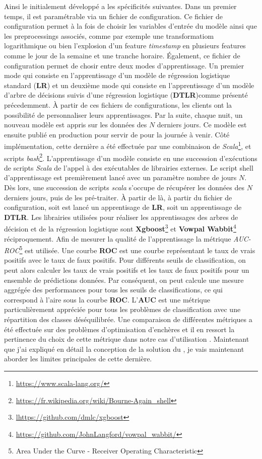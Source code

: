 Ainsi le \bo initialement développé a les spécificités suivantes. Dans un premier temps, il est paramétrable via un fichier de configuration. Ce fichier de configuration permet à la fois de choisir les variables d'entrée du modèle ainsi que les preprocessings associés, comme par exemple une transformatiom logarithmique ou bien l'explosion d'un feature \emph{timestamp} en plusieurs features comme le jour de la semaine et une tranche horaire.
Également, ce fichier de configuration permet de chosir entre deux modes d'apprentissage. Un premier mode qui consiste en l'apprentissage d'un modèle de régression logistique standard (\textbf{LR}) et un deuxième mode qui consiste en l'apprentissage d'un modèle d'arbre de décisions suivis d'une régression logistique (\textbf{DTLR})comme présenté précedemment. 
À partir de ces fichiers de configurations, les clients ont la possibilité de personnaliser leurs apprentissages. Par la suite, chaque nuit, un nouveau modèle est appris sur les données des $N$ derniers jours. Ce modèle est ensuite publié en production pour servir de \bo pour la journée à venir. 
Côté implémentation, cette dernière a été effectuée par une combinaison de \emph{Scala}\footnote{\url{https://www.scala-lang.org/}}, et scripts \emph{bash}\footnote{\url{https://fr.wikipedia.org/wiki/Bourne-Again_shell}}.
L'apprentissage d'un modèle consiste en une succession d'exécutions de scripts \emph{Scala} de l'appel à des exécutables de librairies externes. Le script shell d'apprentissage est premièrement lancé avec un paramètre nombre de jours $N$. Dès lors, une succession de scripts \emph{scala} s'occupe de récupérer les données des $N$ derniers jours, puis de les pré-traiter. À partir de là, à partir du fichier de configuration, soit est lancé un apprentisage de \textbf{LR}, soit un apprentissage de \textbf{DTLR}. Les librairies utilisées pour réaliser les apprentissages des arbres de décision et de la régression logistique sont \textbf{Xgboost}\footnote{\url{lhttps://github.com/dmlc/xgboost}} \cite{Chen:2016:XST:2939672.2939785} et \textbf{Vowpal Wabbit}\footnote{\url{https://github.com/JohnLangford/vowpal_wabbit/}} \cite{langford2009sparse} réciproquement. Afin de mesurer la qualité de l'apprentissage la métrique \emph{AUC-ROC}\footnote{Area Under the Curve - Receiver Operating Characteristic} est utilisée. Une courbe \textbf{ROC} est une courbe représentant le taux de vrais positifs avec le taux de faux positifs. Pour différents seuils de classification, on peut alors calculer les taux de vrais positifs et les taux de faux positifs pour un ensemble de prédictions données. Par conséquent, on peut calcule une mesure aggrégée des performances pour tous les seuils de classifications, ce qui correspond à l'aire sous la courbe \textbf{ROC}. L'\textbf{AUC} est une métrique particulièrement appréciée pour tous les problèmes de classification avec une répartition des classes déséquilibrée. Une comparaison de différentes métriques a été effectuée sur des problèmes d'optimisation d'enchères et il en ressort la pertinence du choix de cette métrique dans notre cas d'utilisation \cite{yi2013predictive}. Maintenant que j'ai expliqué en détail la conception de la solution du \bo, je vais maintenant aborder les limites principales de cette dernière. 
